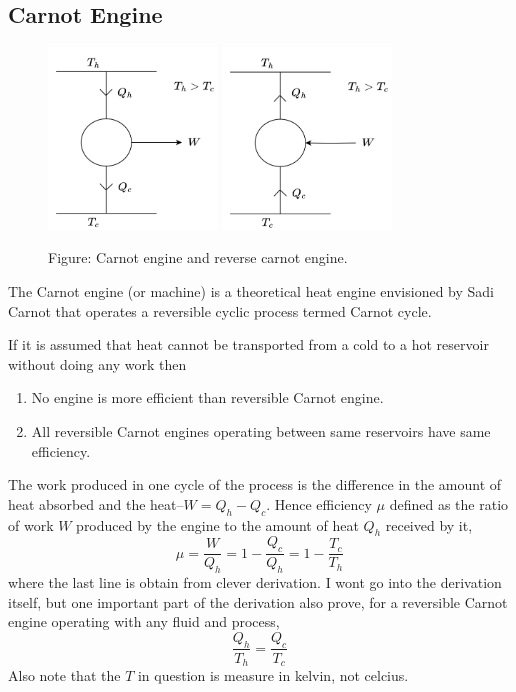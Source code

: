 \documentclass[../../../Main.tex]{subfiles}
\begin{document}
\subsection*{Carnot Engine}
\begin{figure}
    \centering
    \includegraphics[width=0.4\textwidth]{../../../Rss/Themodynamics/KeyConcepts/CarnotEngine.png}
    \includegraphics[width=0.4\textwidth]{../../../Rss/Themodynamics/KeyConcepts/ReverseCarnotEngine.png}
    \caption*{Figure: Carnot engine and reverse carnot engine.}
\end{figure}
The Carnot engine (or machine) is a theoretical heat engine envisioned by Sadi Carnot that operates a reversible cyclic process termed Carnot cycle.

If it is assumed that heat cannot be transported from a cold to a hot reservoir without doing any work then
\begin{enumerate}
    \item No engine is more efficient than reversible Carnot engine.
    \item All reversible Carnot engines operating between same reservoirs have same efficiency. 
\end{enumerate}

The work produced in one cycle of the process is the difference in the amount of heat absorbed and the heat--$W=Q_h-Q_c$. Hence efficiency $\mu$ defined as the ratio of work $W$ produced by the engine to the amount of heat $Q_h$ received by it,
\begin{equation*}
    \mu=\frac{W}{Q_h}=1-\frac{Q_c }{Q_h}=1-\frac{T_c}{T_h}
\end{equation*}
where the last line is obtain from clever derivation. I wont go into the derivation itself, but one important part of the derivation also prove, for a reversible Carnot engine operating with any fluid and process, 
\begin{equation*}
    \frac{Q_h}{T_h}=\frac{Q_c}{T_c}
\end{equation*}
Also note that the $T$ in question is measure in kelvin, not celcius. 
\end{document}
